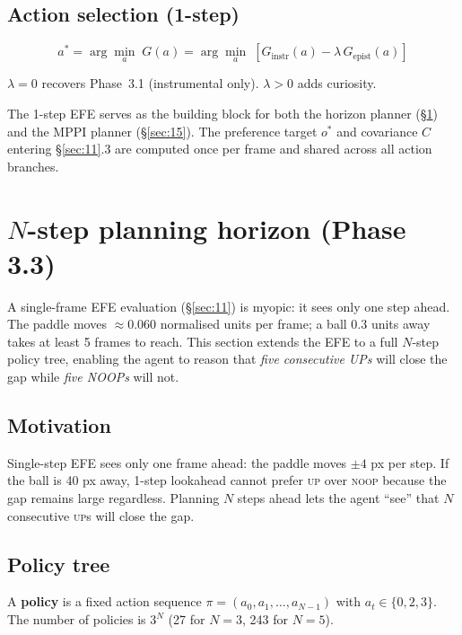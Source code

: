 \documentclass[12pt, a4paper]{article}
\newcommand{\1}{\mathbf{1}}
\begin{document}
\subsection{Action selection (1-step)}

\[
a^* = \arg\min_a\; G(a)
= \arg\min_a\;\left[G_\text{instr}(a) - \lambda\, G_\text{epist}(a)\right]
\]

$\lambda = 0$ recovers Phase~3.1 (instrumental only).
$\lambda > 0$ adds curiosity.

The 1-step EFE serves as the building block for both the horizon planner
(\S\ref{sec:12}) and the MPPI planner (\S\ref{sec:15}).  The preference target
$o^*$ and covariance $C$ entering \S\ref{sec:11}.3 are computed once per frame
and shared across all action branches.

\section{$N$-step planning horizon (Phase 3.3)}
\label{sec:12}

A single-frame EFE evaluation (\S\ref{sec:11}) is myopic: it sees only one step
ahead.  The paddle moves $\approx 0.060$ normalised units per frame; a ball
0.3 units away takes at least 5 frames to reach.  This section extends the EFE to
a full $N$-step policy tree, enabling the agent to reason that \textit{five
consecutive UPs} will close the gap while \textit{five NOOPs} will not.

\subsection{Motivation}

Single-step EFE sees only one frame ahead: the paddle moves $\pm 4$ px per step.
If the ball is 40 px away, 1-step lookahead cannot prefer \textsc{up} over
\textsc{noop} because the gap remains large regardless.  Planning $N$ steps ahead
lets the agent ``see'' that $N$ consecutive \textsc{up}s will close the gap.

\subsection{Policy tree}

A \textbf{policy} is a fixed action sequence $\pi = (a_0, a_1, \ldots, a_{N-1})$
with $a_t \in \{0, 2, 3\}$.  The number of policies is $3^N$ (27 for $N=3$, 243
for $N=5$).
\end{document}
